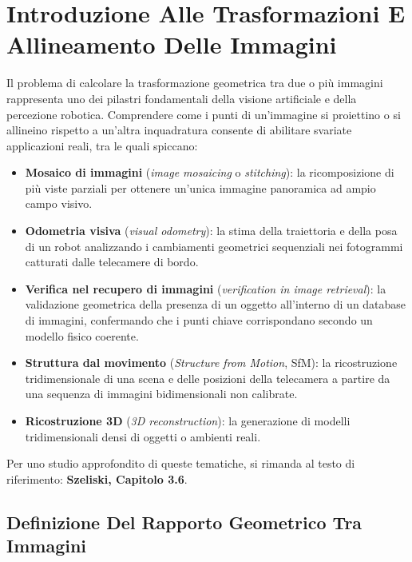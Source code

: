 ﻿\documentclass[11pt, a4paper]{article}
\author{Francesco Lo Verde}
\begin{document}
\section{Introduzione Alle Trasformazioni E Allineamento Delle Immagini}

Il problema di calcolare la trasformazione geometrica tra due o più immagini rappresenta uno dei pilastri fondamentali della visione artificiale e della percezione robotica. Comprendere come i punti di un'immagine si proiettino o si allineino rispetto a un'altra inquadratura consente di abilitare svariate applicazioni reali, tra le quali spiccano:
\begin{itemize}[noitemsep]
    \item \textbf{Mosaico di immagini} (\emph{image mosaicing} o \emph{stitching}): la ricomposizione di più viste parziali per ottenere un'unica immagine panoramica ad ampio campo visivo.
    \item \textbf{Odometria visiva} (\emph{visual odometry}): la stima della traiettoria e della posa di un robot analizzando i cambiamenti geometrici sequenziali nei fotogrammi catturati dalle telecamere di bordo.
    \item \textbf{Verifica nel recupero di immagini} (\emph{verification in image retrieval}): la validazione geometrica della presenza di un oggetto all'interno di un database di immagini, confermando che i punti chiave corrispondano secondo un modello fisico coerente.
    \item \textbf{Struttura dal movimento} (\emph{Structure from Motion}, SfM): la ricostruzione tridimensionale di una scena e delle posizioni della telecamera a partire da una sequenza di immagini bidimensionali non calibrate.
    \item \textbf{Ricostruzione 3D} (\emph{3D reconstruction}): la generazione di modelli tridimensionali densi di oggetti o ambienti reali.
\end{itemize}


Per uno studio approfondito di queste tematiche, si rimanda al testo di riferimento: \textbf{Szeliski, Capitolo 3.6}.

\subsection{Definizione Del Rapporto Geometrico Tra Immagini}
\end{document}
